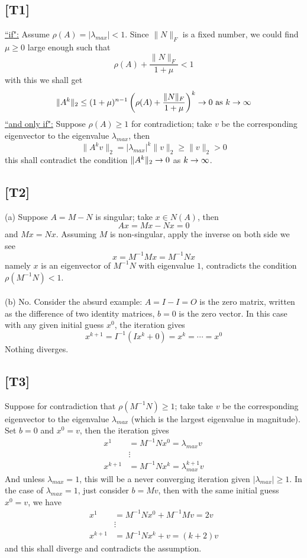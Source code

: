\documentclass[12pt,a4paper]{article}
\newcommand{\ra}[1]{\ifnum #1=1\rightarrow\fi\ifnum #1=2\Rightarrow\fi}
\newcommand{\claim}[1]{\underline{``{#1}":}}
\newcommand{\bga}{\begin{align*}}
\renewcommand{\l}{\left}\renewcommand{\r}{\right}
\begin{document}
\subsection*{[T1]} 
\claim{if} Assume $\rho(A) = |\lambda_{max}| < 1$. Since $\|N\|_F$ is a fixed number, we could find $\mu \geq 0$ large enough such that 
$$\rho(A) + \frac{\|N\|_F}{1+\mu} < 1$$
with this we shall get 
$$\|A^k\|_2 \leq (1+\mu)^{n-1} \l(\rho(A) + \frac{\|N\|_F}{1+\mu} \r)^k \ra1 0 \text{ as } k \ra1 \infty$$
\claim{and only if} Suppose $\rho(A) \geq 1$ for contradiction; take $v$ be the corresponding eigenvector to the eigenvalue $\lambda_{max}$, then
$$\|A^k v \|_2 = |\lambda_{max}|^k\|v\|_2 \geq \|v\|_2 > 0$$
this shall contradict the condition $\|A^k\|_2 \ra1 0$ as $k\ra1\infty$. 


\subsection*{[T2]} (a) Suppose $A = M-N$ is singular; take $x\in N(A)$, then
$$Ax = Mx - Nx = 0$$
and $Mx = Nx$. Assuming $M$ is non-singular, apply the inverse on both side we see
$$x = M^{-1}Mx = M^{-1}Nx$$
namely $x$ is an eigenvector of $M^{-1}N$ with eigenvalue $1$, contradicts the condition $\rho(M^{-1}N) < 1$. \\
\\
(b) No. Consider the absurd example: $A = I - I = O$ is the zero matrix, written as the difference of two identity matrices, $b = 0$ is the zero vector. In this case with any given initial guess $x^0$, the iteration gives
$$x^{k+1} = I^{-1}\l(Ix^{k} + 0\r) = x^{k} = \cdots = x^0$$
Nothing diverges. 

\subsection*{[T3]}
Suppose for contradiction that $\rho(M^{-1}N) \geq 1$; take take $v$ be the corresponding eigenvector to the eigenvalue $\lambda_{max}$ (which is the largest eigenvalue in magnitude). Set $b = 0$ and $x^0 = v$, then the iteration gives
\bga
x^1 & = M^{-1}N x^0 = \lambda_{max} v\\
& \vdots \\
x^{k+1} & = M^{-1}Nx^k = \lambda_{max}^{k+1}v
\end{align*}
And unless $\lambda_{max} = 1$, this will be a never converging iteration given $|\lambda_{max}| \geq 1$. In the case of $\lambda_{max} = 1$, just consider $b = Mv$, then with the same initial guess $x^0 = v$, we have 
\bga
x^1 & = M^{-1}N x^0 + M^{-1}Mv = 2v \\
& \vdots\\
x^{k+1} & = M^{-1}N x^k + v = (k+2)v
\end{align*}
and this shall diverge and contradicts the assumption. 
\end{document}
